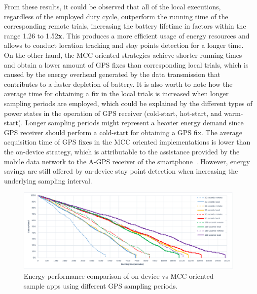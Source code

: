 \documentclass[ENG,PhD]{cinvestav}
\begin{document}
From these results, it could be observed that all of the local executions, regardless of the employed duty cycle, outperform the running time of the corresponding remote trials, increasing the battery lifetime in factors within the range 1.26 to 1.52\textbf{x}.
This produces a more efficient usage of energy resources and allows to conduct location tracking and stay points detection for a longer time.
On the other hand, the MCC oriented strategies achieve shorter running times and obtain a lower amount of GPS fixes than corresponding local trials, which is caused by the energy overhead generated by the data transmission that contributes to a faster depletion of battery.
It is also worth to note how the average time for obtaining a fix in the local trials is increased when longer sampling periods are employed, which could be explained by the different types of power states in the operation of GPS receiver (cold-start, hot-start, and warm-start).
Longer sampling periods might represent a heavier energy demand since GPS receiver should perform a cold-start for obtaining a GPS fix.
The average acquisition time of GPS fixes in the MCC oriented implementations is lower than the on-device strategy, which is attributable to the assistance provided by the mobile data network to the A-GPS receiver of the smartphone~\cite{Agarwal2002,Liu2012}.
However, energy savings are still offered by on-device stay point detection when increasing the underlying sampling interval.

\begin{figure}
  \centering
  \includegraphics[width=\columnwidth]{vectors/plot-energy-performance-r2}
  \caption{Energy performance comparison of on-device vs MCC oriented sample apps using different GPS sampling periods.}
  \label{fig:plot-energy-performance}
\end{figure}
\end{document}
